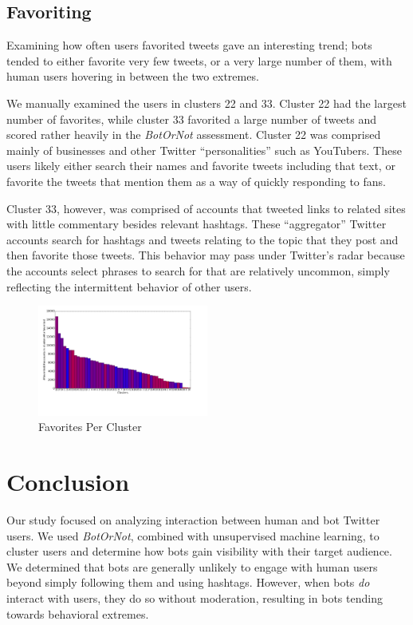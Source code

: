 \documentclass{sig-alternate-05-2015}
\begin{document}
\subsection{Favoriting}

Examining how often users favorited tweets gave an interesting trend; bots tended to either favorite very few tweets, or a very large number of them, with human users hovering in between the two extremes.

We manually examined the users in clusters 22 and 33. Cluster 22 had the largest number of favorites, while cluster 33 favorited a large number of tweets and scored rather heavily in the \emph{BotOrNot} assessment. Cluster 22 was comprised mainly of businesses and other Twitter ``personalities'' such as YouTubers. These users likely either search their names and favorite tweets including that text, or favorite the tweets that mention them as a way of quickly responding to fans.

Cluster 33, however, was comprised of accounts that tweeted links to related sites with little commentary besides relevant hashtags. These ``aggregator'' Twitter accounts search for hashtags and tweets relating to the topic that they post and then favorite those tweets. This behavior may pass under Twitter's radar because the accounts select phrases to search for that are relatively uncommon, simply reflecting the intermittent behavior of other users.

\begin{figure}[h!]
	\caption{Favorites Per Cluster}
	\centering
		\includegraphics[width=0.5\textwidth]{imgs/favorites}
\end{figure}

\section{Conclusion}
Our study focused on analyzing interaction between human and bot Twitter users. We used \emph{BotOrNot}, combined with unsupervised machine learning, to cluster users and determine how bots gain visibility with their target audience. We determined that bots are generally unlikely to engage with human users beyond simply following them and using hashtags. However, when bots \emph{do} interact with users, they do so without moderation, resulting in bots tending towards behavioral extremes.
\end{document}
